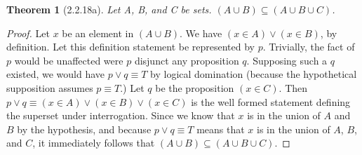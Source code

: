 \documentclass[a4paper, 12pt]{article}
\theoremstyle{plain}
\newtheorem*{theorem*}{Theorem}
\begin{document}
	
	\begin{theorem*}[2.2.18a]
		Let A, B, and C be sets. $(A \cup B) \subseteq (A \cup B \cup C)$.
	\end{theorem*}
	
	\begin{proof}
		Let $x$ be an element in $(A \cup B)$. We have $(x \in A) \lor (x \in B)$, by definition. 
		Let this definition statement be represented by $p$. Trivially, the fact of $p$ would be 
		unaffected were $p$ disjunct any proposition $q$. Supposing such a $q$ existed, we would have 
		$p \lor q \equiv T$ by logical domination (because the hypothetical supposition assumes 
		$p \equiv T$.) Let $q$ be the proposition $(x \in C)$. Then 
		$p \lor q \equiv (x \in A) \lor (x \in B) \lor (x \in C)$ is the well formed statement 
		defining the superset under interrogation. Since we know that $x$ is in the union of $A$ and 
		$B$ by the hypothesis, and because $p \lor q \equiv T$ means that $x$ is in the union of 
		$A$, $B$, and $C$, it immediately follows that \newline $(A \cup B) \subseteq (A \cup B \cup C)$.
	\end{proof}
\end{document}
